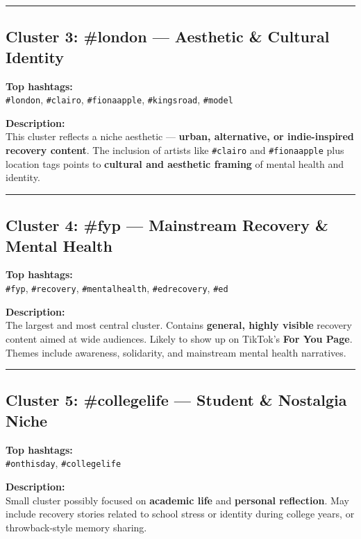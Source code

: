 \documentclass[
]{article}
\begin{document}
\begin{center}\rule{0.5\linewidth}{0.5pt}\end{center}

\subsection{\texorpdfstring{Cluster 3: \textbf{\#london --- Aesthetic \&
Cultural
Identity}}{Cluster 3: \#london --- Aesthetic \& Cultural Identity}}\label{cluster-3-london-aesthetic-cultural-identity}

\textbf{Top hashtags:}\\
\texttt{\#london}, \texttt{\#clairo}, \texttt{\#fionaapple},
\texttt{\#kingsroad}, \texttt{\#model}

\textbf{Description:}\\
This cluster reflects a niche aesthetic --- \textbf{urban, alternative,
or indie-inspired recovery content}. The inclusion of artists like
\texttt{\#clairo} and \texttt{\#fionaapple} plus location tags points to
\textbf{cultural and aesthetic framing} of mental health and identity.

\begin{center}\rule{0.5\linewidth}{0.5pt}\end{center}

\subsection{\texorpdfstring{Cluster 4: \textbf{\#fyp --- Mainstream
Recovery \& Mental
Health}}{Cluster 4: \#fyp --- Mainstream Recovery \& Mental Health}}\label{cluster-4-fyp-mainstream-recovery-mental-health}

\textbf{Top hashtags:}\\
\texttt{\#fyp}, \texttt{\#recovery}, \texttt{\#mentalhealth},
\texttt{\#edrecovery}, \texttt{\#ed}

\textbf{Description:}\\
The largest and most central cluster. Contains \textbf{general, highly
visible} recovery content aimed at wide audiences. Likely to show up on
TikTok's \textbf{For You Page}. Themes include awareness, solidarity,
and mainstream mental health narratives.

\begin{center}\rule{0.5\linewidth}{0.5pt}\end{center}

\subsection{\texorpdfstring{Cluster 5: \textbf{\#collegelife --- Student
\& Nostalgia
Niche}}{Cluster 5: \#collegelife --- Student \& Nostalgia Niche}}\label{cluster-5-collegelife-student-nostalgia-niche}

\textbf{Top hashtags:}\\
\texttt{\#onthisday}, \texttt{\#collegelife}

\textbf{Description:}\\
Small cluster possibly focused on \textbf{academic life} and
\textbf{personal reflection}. May include recovery stories related to
school stress or identity during college years, or throwback-style
memory sharing.
\end{document}
